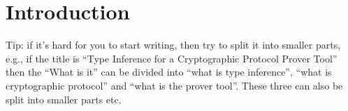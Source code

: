 \newpage
\section{Introduction}


Tip: if it's hard for you to start writing, then try to split it into smaller parts, e.g., if the title is ``Type Inference for a Cryptographic Protocol Prover Tool'' then the ``What is it'' can be divided into ``what is type inference'', ``what is cryptographic protocol'' and ``what is the prover tool''. These three can also be split into smaller parts etc.
